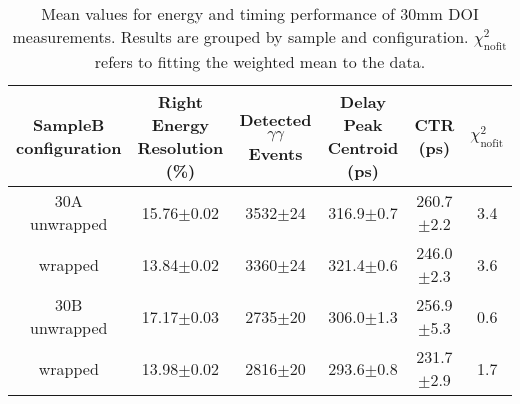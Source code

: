 \begin{table}
\caption{\label{tab:doictrresults} Mean values for energy and timing performance of 30mm DOI measurements. Results are grouped by sample and configuration. $\chi^2_\text{nofit}$ refers to fitting the weighted mean to the data.}
\begin{tabular}{cccccc}
\hline
SampleB configuration & Right Energy Resolution (\%) & Detected $\gamma\gamma$ Events & Delay Peak Centroid (ps)  & CTR (ps) &  $\chi^2_\text{nofit}$ \\
\hline
30A     unwrapped     &  15.76$\pm$0.02 &  3532$\pm$24 &  316.9$\pm$0.7 &  260.7$\pm$2.2 &    3.4 \\
        wrapped       &  13.84$\pm$0.02 &  3360$\pm$24 &  321.4$\pm$0.6 &  246.0$\pm$2.3 &    3.6 \\
30B     unwrapped     &  17.17$\pm$0.03 &  2735$\pm$20 &  306.0$\pm$1.3 &  256.9$\pm$5.3 &    0.6 \\
        wrapped       &  13.98$\pm$0.02 &  2816$\pm$20 &  293.6$\pm$0.8 &  231.7$\pm$2.9 &    1.7 \\
\hline
\end{tabular}
\end{table}

